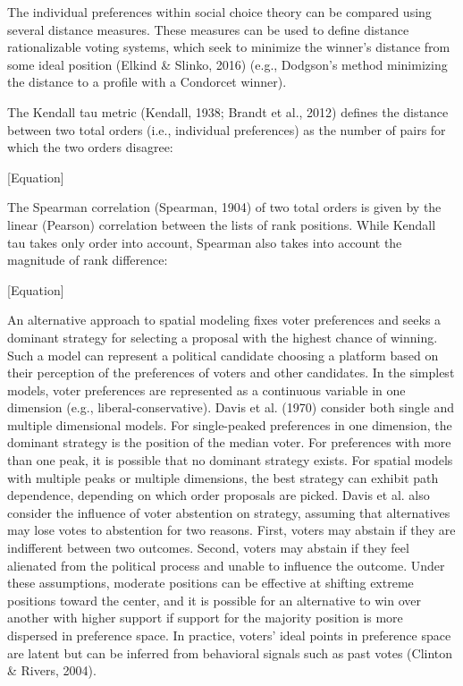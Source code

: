 The individual preferences within social choice theory can be compared using several distance measures. These measures can be used to define distance rationalizable voting systems, which seek to minimize the winner's distance from some ideal position (Elkind \& Slinko, 2016) (e.g., Dodgson's method minimizing the distance to a profile with a Condorcet winner).

The Kendall tau metric (Kendall, 1938; Brandt et al., 2012) defines the distance between two total orders (i.e., individual preferences) as the number of pairs for which the two orders disagree:

[Equation]

The Spearman correlation (Spearman, 1904) of two total orders is given by the linear (Pearson) correlation between the lists of rank positions. While Kendall tau takes only order into account, Spearman also takes into account the magnitude of rank difference:

[Equation]

An alternative approach to spatial modeling fixes voter preferences and seeks a dominant strategy for selecting a proposal with the highest chance of winning. Such a model can represent a political candidate choosing a platform based on their perception of the preferences of voters and other candidates. In the simplest models, voter preferences are represented as a continuous variable in one dimension (e.g., liberal-conservative). Davis et al. (1970) consider both single and multiple dimensional models. For single-peaked preferences in one dimension, the dominant strategy is the position of the median voter. For preferences with more than one peak, it is possible that no dominant strategy exists. For spatial models with multiple peaks or multiple dimensions, the best strategy can exhibit path dependence, depending on which order proposals are picked. Davis et al. also consider the influence of voter abstention on strategy, assuming that alternatives may lose votes to abstention for two reasons. First, voters may abstain if they are indifferent between two outcomes. Second, voters may abstain if they feel alienated from the political process and unable to influence the outcome. Under these assumptions, moderate positions can be effective at shifting extreme positions toward the center, and it is possible for an alternative to win over another with higher support if support for the majority position is more dispersed in preference space. In practice, voters' ideal points in preference space are latent but can be inferred from behavioral signals such as past votes (Clinton \& Rivers, 2004).

